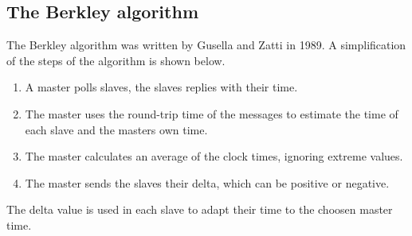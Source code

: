 \subsection{The Berkley algorithm}
The Berkley algorithm was written by Gusella and Zatti in 1989. A simplification of the steps of the algorithm is shown below. 

\begin{enumerate}
\item A master polls slaves, the slaves replies with their time.
\item The master uses the round-trip time of the messages to estimate the time of each slave and the masters own time.
\item The master calculates an average of the clock times, ignoring extreme values.
\item The master sends the slaves their delta, which can be positive or negative. 
\end{enumerate}
\label{fig:mifare-auth}

The delta value is used in each slave to adapt their time to the choosen master time. 

